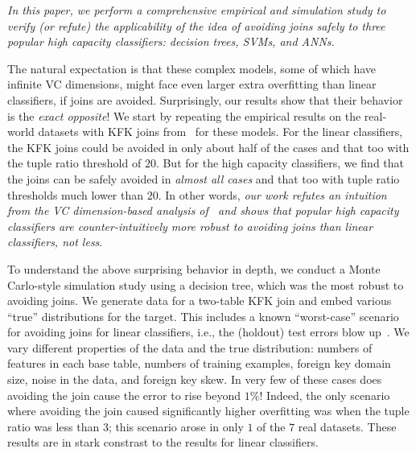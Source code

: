 \documentclass{vldb}
\begin{document}
\textit{In this paper, we perform a comprehensive empirical and simulation study to verify (or refute) 
the applicability of the idea of avoiding joins safely to three popular high capacity classifiers:
decision trees, SVMs, and ANNs.}

The natural expectation is that these complex models, some of which have infinite VC dimensions, might 
face even larger extra overfitting than linear classifiers, if joins are avoided. Surprisingly, our results 
show that their behavior is the \textit{exact opposite}! We start by repeating the empirical results 
on the real-world datasets with KFK joins from~\cite{hamlet} for these models. 
For the linear classifiers, the KFK joins could be avoided in only about half of the cases and that 
too with the tuple ratio threshold of $20$. But for the high capacity classifiers, we find that the joins can be 
safely avoided in \textit{almost all cases} and that too with tuple ratio thresholds much lower than $20$. 
In other words, \textit{our work refutes an intuition from the VC dimension-based analysis of~\cite{hamlet} 
and shows that popular high capacity classifiers are counter-intuitively \textit{more} robust to avoiding joins 
than linear classifiers, not less}.

To understand the above surprising behavior in depth, we conduct a Monte Carlo-style simulation study using a decision tree,
which was the most robust to avoiding joins. We generate data for a two-table KFK join 
and embed various ``true'' distributions for the target. This includes a known ``worst-case'' scenario for avoiding joins for linear classifiers, 
i.e., the (holdout) test errors blow up~\cite{hamlet}. We vary different properties of the data and the true distribution: 
numbers of features in each base table, numbers of training examples, foreign key domain size, noise in the data, and foreign key skew. 
In very few of these cases does avoiding the join cause the error to rise beyond $1\%$! Indeed, the only scenario where avoiding the join 
caused significantly higher overfitting was when the tuple ratio was less than $3$; this scenario arose in only $1$ of the $7$ real datasets.
These results are in stark constrast to the results for linear classifiers.
\end{document}
